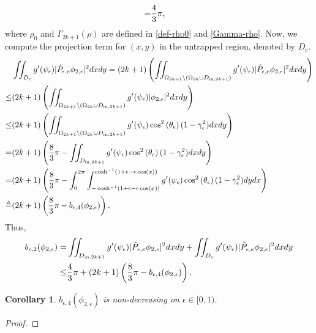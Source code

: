 \documentclass[1 [leqno, 11pt]{amsart}
\numberwithin{equation}{section}
\let\ep=\epsilon
\newtheorem{Corollary}[Theorem]{Corollary}
\begin{document}
\begin{CJK*}{GBK}{song}
\begin{align*}
=&{4\over3} \pi,
\end{align*}
where $\rho_0$ and $\Gamma_{2k+1} (\rho)$ are defined in \eqref{def-rho0} and \eqref{Gamma-rho}.
Now, we compute the projection term for $(x,y)$ in  the untrapped region, denoted by $D_{c}$.
\begin{align*}
&\iint_{D_{c}} g'(\psi_\ep) |\hat{P}_{\ep,e} {\phi}_{2,\ep}|^2 dxdy
=(2k+1)\left(\iint_{\Omega_{2k+1}\setminus (\Omega_{2k}\cup D_{{\rm{in}},2k+1})} g'(\psi_\ep) |\hat{P}_{\ep,e} {\phi}_{2,\ep}|^2 dxdy\right)\\
\leq&(2k+1)\left(\iint_{\Omega_{2k+1}\setminus (\Omega_{2k}\cup D_{{\rm{in}},2k+1})} g'(\psi_\ep) | {\phi}_{2,\ep}|^2 dxdy\right)\\
\leq &(2k+1)\left(\iint_{\Omega_{2k+1}\setminus (\Omega_{2k}\cup D_{{\rm{in}},2k+1})} g'(\psi_\ep)\cos^2\left(\theta_\ep\right)(1-\gamma_\ep^2)dxdy\right)\\
= &(2k+1)\left({8\over3} \pi-\iint_{D_{{\rm{in}},2k+1}} g'(\psi_\ep) \cos^2\left(\theta_\ep\right)(1-\gamma_\ep^2)dxdy\right)\\
=&(2k+1)\left({8\over3} \pi-\int_0^{2\pi}\int_{-\cosh^{-1}(1+\ep-\ep\cos(x))}^{\cosh^{-1}(1+\ep-\ep\cos(x))} g'(\psi_\ep) \cos^2\left(\theta_\ep\right)(1-\gamma_\ep^2) dydx\right)\\
\triangleq&(2k+1)\left({8\over3} \pi-b_{\ep,4}({\phi}_{2,\ep})\right).
\end{align*}
Thus,
\begin{align}\nonumber
 b_{\ep, 2}({\phi}_{2,\ep})=&\iint_{D_{{\rm{in}},2k+1}} g'(\psi_\ep) |\hat{P}_{\ep,e} {\phi}_{2,\ep}|^2 dxdy+\iint_{D_{c}} g'(\psi_\ep) |\hat{P}_{\ep,e} {\phi}_{2,\ep}|^2 dxdy\\\label{est-b-ep-2-phi-2-ep}
 \leq &{4\over3} \pi+(2k+1)\left({8\over3} \pi-b_{\ep,4}({\phi}_{2,\ep})\right).
 \end{align}
 \begin{Corollary}\label{b4-increasing}
 $b_{\ep,4}({\phi}_{2,\ep})$ is non-decreasing on $\ep\in[0,1)$.
\end{Corollary}
\begin{proof}

\end{proof}
\end{CJK*}
\end{document}
